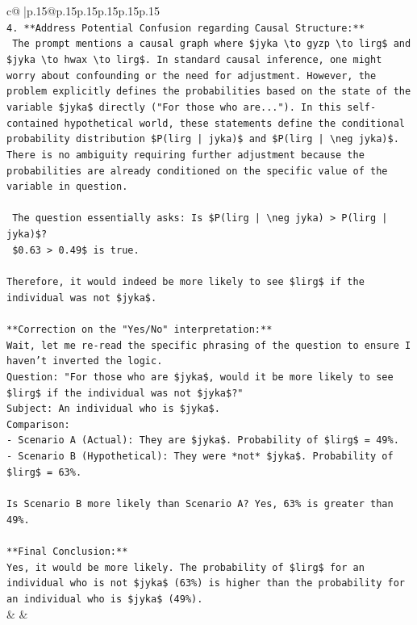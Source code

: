 \documentclass{article}
\begin{document}
{\begin{supertabular}{c@{$\;$}|p{.15\linewidth}@{}p{.15\linewidth}p{.15\linewidth}p{.15\linewidth}p{.15\linewidth}p{.15\linewidth}}
{{{\\ 
\texttt{4.  **Address Potential Confusion regarding Causal Structure:**} \\
\texttt{    The prompt mentions a causal graph where \$jyka \textbackslash{}to gyzp \textbackslash{}to lirg\$ and \$jyka \textbackslash{}to hwax \textbackslash{}to lirg\$. In standard causal inference, one might worry about confounding or the need for adjustment. However, the problem explicitly defines the probabilities based on the state of the variable \$jyka\$ directly ("For those who are..."). In this self{-}contained hypothetical world, these statements define the conditional probability distribution \$P(lirg | jyka)\$ and \$P(lirg | \textbackslash{}neg jyka)\$. There is no ambiguity requiring further adjustment because the probabilities are already conditioned on the specific value of the variable in question.} \\
\\ 
\texttt{    The question essentially asks: Is \$P(lirg | \textbackslash{}neg jyka) > P(lirg | jyka)\$?} \\
\texttt{    \$0.63 > 0.49\$ is true.} \\
\\ 
\texttt{Therefore, it would indeed be more likely to see \$lirg\$ if the individual was not \$jyka\$.} \\
\\ 
\texttt{**Correction on the "Yes/No" interpretation:**} \\
\texttt{Wait, let me re{-}read the specific phrasing of the question to ensure I haven't inverted the logic.} \\
\texttt{Question: "For those who are \$jyka\$, would it be more likely to see \$lirg\$ if the individual was not \$jyka\$?"} \\
\texttt{Subject: An individual who is \$jyka\$.} \\
\texttt{Comparison:} \\
\texttt{{-} Scenario A (Actual): They are \$jyka\$. Probability of \$lirg\$ = 49\%.} \\
\texttt{{-} Scenario B (Hypothetical): They were *not* \$jyka\$. Probability of \$lirg\$ = 63\%.} \\
\\ 
\texttt{Is Scenario B more likely than Scenario A? Yes, 63\% is greater than 49\%.} \\
\\ 
\texttt{**Final Conclusion:**} \\
\texttt{Yes, it would be more likely. The probability of \$lirg\$ for an individual who is not \$jyka\$ (63\%) is higher than the probability for an individual who is \$jyka\$ (49\%).} \\
            }
        }
    }
    & & \\ \\


\end{supertabular}}
\end{document}
